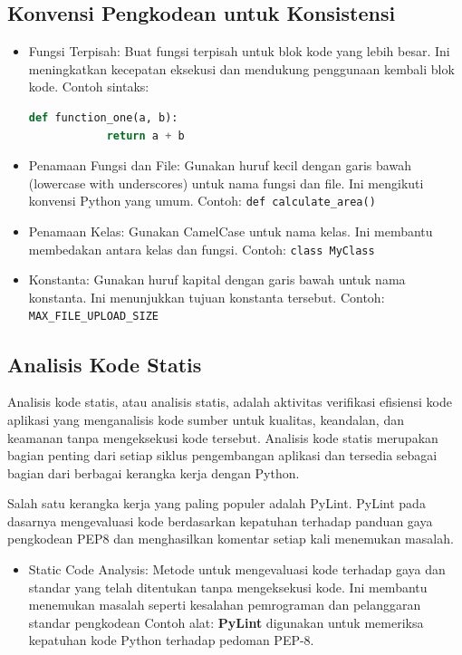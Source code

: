 \documentclass{article}
\begin{document}
\subsection{Konvensi Pengkodean untuk Konsistensi}
\begin{itemize}
    \item Fungsi Terpisah: Buat fungsi terpisah untuk blok kode yang lebih besar. Ini meningkatkan kecepatan eksekusi dan mendukung penggunaan kembali blok kode. Contoh sintaks:
          \begin{lstlisting}[language=Python, caption={}, captionpos=b]
            def function_one(a, b):
            return a + b
        \end{lstlisting}
    \item Penamaan Fungsi dan File: Gunakan huruf kecil dengan garis bawah (lowercase with underscores) untuk nama fungsi dan file. Ini mengikuti konvensi Python yang umum. Contoh: \verb|def calculate_area()|
    \item Penamaan Kelas: Gunakan CamelCase untuk nama kelas. Ini membantu membedakan antara kelas dan fungsi. Contoh: \verb|class MyClass|
    \item Konstanta: Gunakan huruf kapital dengan garis bawah untuk nama konstanta. Ini menunjukkan tujuan konstanta tersebut. Contoh: \verb|MAX_FILE_UPLOAD_SIZE|
\end{itemize}

\subsection{Analisis Kode Statis}
Analisis kode statis, atau analisis statis, adalah aktivitas verifikasi efisiensi kode aplikasi yang menganalisis kode sumber untuk kualitas, keandalan, dan keamanan tanpa mengeksekusi kode tersebut. Analisis kode statis merupakan bagian penting dari setiap siklus pengembangan aplikasi dan tersedia sebagai bagian dari berbagai kerangka kerja dengan Python.

Salah satu kerangka kerja yang paling populer adalah PyLint. PyLint pada dasarnya mengevaluasi kode berdasarkan kepatuhan terhadap panduan gaya pengkodean PEP8 dan menghasilkan komentar setiap kali menemukan masalah.

\begin{itemize}
    \item Static Code Analysis: Metode untuk mengevaluasi kode terhadap gaya dan standar yang telah ditentukan tanpa mengeksekusi kode. Ini membantu menemukan masalah seperti kesalahan pemrograman dan pelanggaran standar pengkodean Contoh alat: \textbf{PyLint} digunakan untuk memeriksa kepatuhan kode Python terhadap pedoman PEP-8.
\end{itemize}
\end{document}

